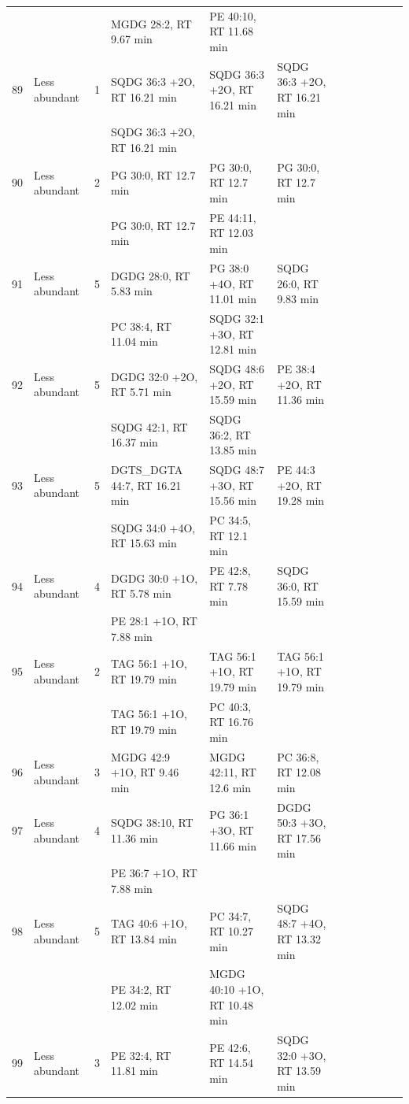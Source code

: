 \begin{landscape}
\begin{footnotesize}
\begin{singlespace}
\begin{flushleft}
\begin{longtable}{ Lp{.03\linewidth} Lp{.12\linewidth} Lp{.03\linewidth} Lp{.24\linewidth} Lp{.24\linewidth} Lp{.24\linewidth} }
 &  &  & MGDG 28:2, RT 9.67 min & PE 40:10, RT 11.68 min &  \\
89 & Less abundant & 1 & SQDG 36:3 +2O, RT 16.21 min & SQDG 36:3 +2O, RT 16.21 min & SQDG 36:3 +2O, RT 16.21 min \\
 &  &  & SQDG 36:3 +2O, RT 16.21 min &  &  \\
90 & Less abundant & 2 & PG 30:0, RT 12.7 min & PG 30:0, RT 12.7 min & PG 30:0, RT 12.7 min \\
 &  &  & PG 30:0, RT 12.7 min & PE 44:11, RT 12.03 min &  \\
91 & Less abundant & 5 & DGDG 28:0, RT 5.83 min & PG 38:0 +4O, RT 11.01 min & SQDG 26:0, RT 9.83 min \\
 &  &  & PC 38:4, RT 11.04 min & SQDG 32:1 +3O, RT 12.81 min &  \\
92 & Less abundant & 5 & DGDG 32:0 +2O, RT 5.71 min & SQDG 48:6 +2O, RT 15.59 min & PE 38:4 +2O, RT 11.36 min \\
 &  &  & SQDG 42:1, RT 16.37 min & SQDG 36:2, RT 13.85 min &  \\
93 & Less abundant & 5 & DGTS\_DGTA 44:7, RT 16.21 min & SQDG 48:7 +3O, RT 15.56 min & PE 44:3 +2O, RT 19.28 min \\
 &  &  & SQDG 34:0 +4O, RT 15.63 min & PC 34:5, RT 12.1 min &  \\
94 & Less abundant & 4 & DGDG 30:0 +1O, RT 5.78 min & PE 42:8, RT 7.78 min & SQDG 36:0, RT 15.59 min \\
 &  &  & PE 28:1 +1O, RT 7.88 min &  &  \\
95 & Less abundant & 2 & TAG 56:1 +1O, RT 19.79 min & TAG 56:1 +1O, RT 19.79 min & TAG 56:1 +1O, RT 19.79 min \\
 &  &  & TAG 56:1 +1O, RT 19.79 min & PC 40:3, RT 16.76 min &  \\
96 & Less abundant & 3 & MGDG 42:9 +1O, RT 9.46 min & MGDG 42:11, RT 12.6 min & PC 36:8, RT 12.08 min \\
97 & Less abundant & 4 & SQDG 38:10, RT 11.36 min & PG 36:1 +3O, RT 11.66 min & DGDG 50:3 +3O, RT 17.56 min \\
 &  &  & PE 36:7 +1O, RT 7.88 min &  &  \\
98 & Less abundant & 5 & TAG 40:6 +1O, RT 13.84 min & PC 34:7, RT 10.27 min & SQDG 48:7 +4O, RT 13.32 min \\
 &  &  & PE 34:2, RT 12.02 min & MGDG 40:10 +1O, RT 10.48 min &  \\
99 & Less abundant & 3 & PE 32:4, RT 11.81 min & PE 42:6, RT 14.54 min & SQDG 32:0 +3O, RT 13.59 min \\

\end{longtable}
\end{flushleft}
\end{singlespace}
\end{footnotesize}
\end{landscape}
